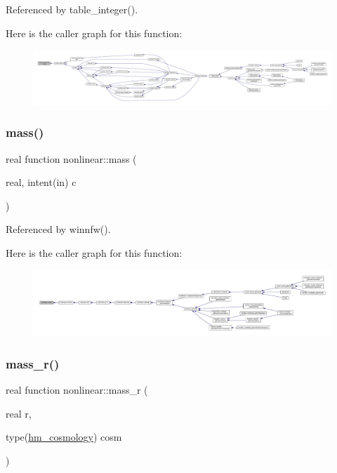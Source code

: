 Referenced by table\+\_\+integer().

Here is the caller graph for this function\+:
\nopagebreak
\begin{figure}[H]
\begin{center}
\leavevmode
\includegraphics[width=350pt]{namespacenonlinear_a623980d65535bc78bbcf5eb8f701ac42_icgraph}
\end{center}
\end{figure}
\mbox{\label{namespacenonlinear_acce5a3564ba00c26a8a5674ab63d5b73}} 
\subsubsection{\texorpdfstring{mass()}{mass()}}
{\footnotesize\ttfamily real function nonlinear\+::mass (\begin{DoxyParamCaption}\item[{real, intent(in)}]{c }\end{DoxyParamCaption})\hspace{0.3cm}{\ttfamily [private]}}



Referenced by winnfw().

Here is the caller graph for this function\+:
\nopagebreak
\begin{figure}[H]
\begin{center}
\leavevmode
\includegraphics[width=350pt]{namespacenonlinear_acce5a3564ba00c26a8a5674ab63d5b73_icgraph}
\end{center}
\end{figure}
\mbox{\label{namespacenonlinear_a164bc94a32486b7a39cab9d1d3ddbafb}} 
\subsubsection{\texorpdfstring{mass\+\_\+r()}{mass\_r()}}
{\footnotesize\ttfamily real function nonlinear\+::mass\+\_\+r (\begin{DoxyParamCaption}\item[{real}]{r,  }\item[{type(\mbox{\hyperlink{structnonlinear_1_1hm__cosmology}{hm\+\_\+cosmology}})}]{cosm }\end{DoxyParamCaption})\hspace{0.3cm}{\ttfamily [private]}}



